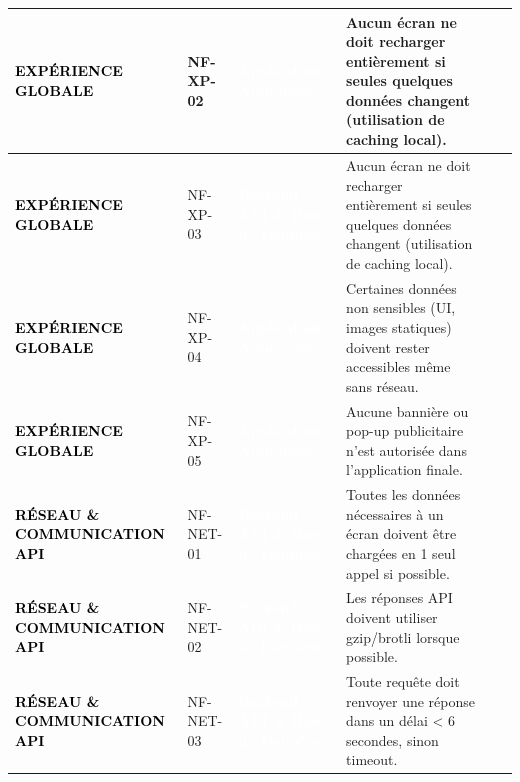 \begin{longtable}{|P{2.15cm}|P{1.55cm}|P{2.35cm}|P{5.60cm}|P{1.65cm}|P{1.45cm}|}
\textcolor{black}{\textbf{EXPÉRIENCE GLOBALE}} & NF-XP-02 & \textcolor{white}{\textbf{Application Apprenant}} & Aucun écran ne doit recharger entièrement si seules quelques données changent (utilisation de caching local). &  &  \\ \hline
{}
\textcolor{black}{\textbf{EXPÉRIENCE GLOBALE}} & NF-XP-03 & \textcolor{white}{\textbf{Backend / API \& Base de Données}} & Aucun écran ne doit recharger entièrement si seules quelques données changent (utilisation de caching local). &  &  \\ \hline
{}
\textcolor{black}{\textbf{EXPÉRIENCE GLOBALE}} & NF-XP-04 & \textcolor{white}{\textbf{Application Apprenant}} & Certaines données non sensibles (UI, images statiques) doivent rester accessibles même sans réseau. &  &  \\ \hline
{}
\textcolor{black}{\textbf{EXPÉRIENCE GLOBALE}} & NF-XP-05 & \textcolor{white}{\textbf{Application Apprenant}} & Aucune bannière ou pop-up publicitaire n’est autorisée dans l’application finale. &  &  \\ \hline
{}
\textcolor{black}{\textbf{RÉSEAU \& COMMUNICATION API}} & NF-NET-01 & \textcolor{white}{\textbf{Backend / API \& Base de Données}} & Toutes les données nécessaires à un écran doivent être chargées en 1 seul appel si possible. &  &  \\ \hline
{}
\textcolor{black}{\textbf{RÉSEAU \& COMMUNICATION API}} & NF-NET-02 & \textcolor{white}{\textbf{Backend / API \& Base de Données}} & Les réponses API doivent utiliser gzip/brotli lorsque possible. &  &  \\ \hline
{}
\textcolor{black}{\textbf{RÉSEAU \& COMMUNICATION API}} & NF-NET-03 & \textcolor{white}{\textbf{Backend / API \& Base de Données}} & Toute requête doit renvoyer une réponse dans un délai < 6 secondes, sinon timeout. &  &  \\ \hline

\end{longtable}

